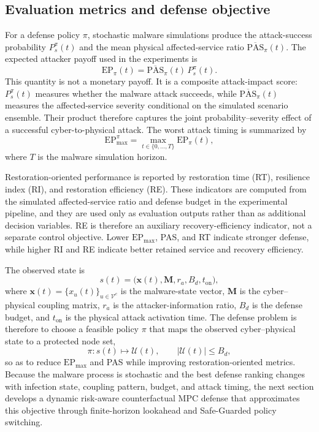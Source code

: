 \documentclass[lettersize,journal]{IEEEtran}
\begin{document}
\subsection{Evaluation metrics and defense objective}
\label{subsec:metrics}

For a defense policy $\pi$, stochastic malware simulations produce the attack-success probability $P_s^\pi(t)$ and the mean physical affected-service ratio $\overline{\mathrm{PAS}}_\pi(t)$. The expected attacker payoff used in the experiments is
\begin{equation}
    \mathrm{EP}_{\pi}(t)
    =
    \overline{\mathrm{PAS}}_\pi(t)\,P_s^\pi(t).
    \label{eq:expected_payoff}
\end{equation}
This quantity is not a monetary payoff. It is a composite attack-impact score: $P_s^\pi(t)$ measures whether the malware attack succeeds, while $\overline{\mathrm{PAS}}_\pi(t)$ measures the affected-service severity conditional on the simulated scenario ensemble. Their product therefore captures the joint probability--severity effect of a successful cyber-to-physical attack. The worst attack timing is summarized by
\begin{equation}
    \mathrm{EP}_{\max}^{\pi}
    =
    \max_{t\in\{0,\ldots,T\}}\mathrm{EP}_{\pi}(t),
    \label{eq:epmax}
\end{equation}
where $T$ is the malware simulation horizon.

Restoration-oriented performance is reported by restoration time (RT), resilience index (RI), and restoration efficiency (RE). These indicators are computed from the simulated affected-service ratio and defense budget in the experimental pipeline, and they are used only as evaluation outputs rather than as additional decision variables. RE is therefore an auxiliary recovery-efficiency indicator, not a separate control objective. Lower $\mathrm{EP}_{\max}$, PAS, and RT indicate stronger defense, while higher RI and RE indicate better retained service and recovery efficiency.

The observed state is
\begin{equation}
    s(t)=\big(\mathbf{x}(t),\mathbf{M},r_a,B_d,t_{\mathrm{on}}\big),
    \label{eq:observed_state}
\end{equation}
where $\mathbf{x}(t)=\{x_u(t)\}_{u\in\mathcal{V}^{c}}$ is the malware-state vector, $\mathbf{M}$ is the cyber--physical coupling matrix, $r_a$ is the attacker-information ratio, $B_d$ is the defense budget, and $t_{\mathrm{on}}$ is the physical attack activation time. The defense problem is therefore to choose a feasible policy $\pi$ that maps the observed cyber--physical state to a protected node set,
\begin{equation}
    \pi:s(t)\mapsto\mathcal{U}(t),\qquad |\mathcal{U}(t)|\leq B_d,
    \label{eq:policy_mapping}
\end{equation}
so as to reduce $\mathrm{EP}_{\max}$ and PAS while improving restoration-oriented metrics. Because the malware process is stochastic and the best defense ranking changes with infection state, coupling pattern, budget, and attack timing, the next section develops a dynamic risk-aware counterfactual MPC defense that approximates this objective through finite-horizon lookahead and Safe-Guarded policy switching.
\end{document}
